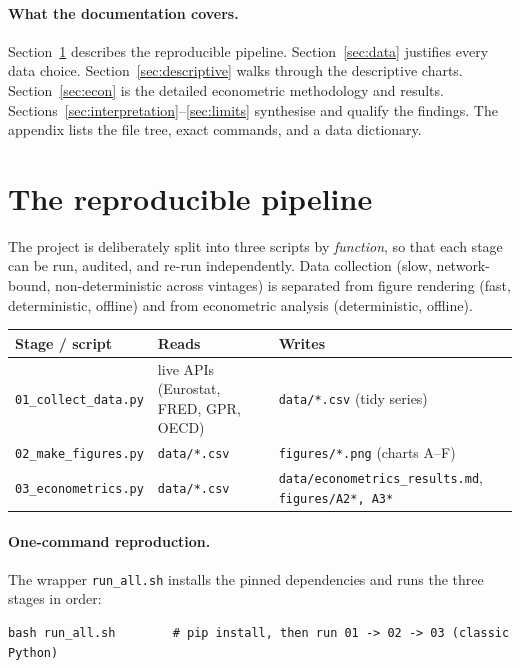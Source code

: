 \documentclass[11pt,a4paper]{article}
\newcommand{\code}[1]{\texttt{#1}}
\begin{document}
\paragraph{What the documentation covers.} Section~\ref{sec:pipeline} describes
the reproducible pipeline. Section~\ref{sec:data} justifies every data choice.
Section~\ref{sec:descriptive} walks through the descriptive charts.
Section~\ref{sec:econ} is the detailed econometric methodology and results.
Sections~\ref{sec:interpretation}--\ref{sec:limits} synthesise and qualify the
findings. The appendix lists the file tree, exact commands, and a data
dictionary.

\section{The reproducible pipeline}\label{sec:pipeline}

The project is deliberately split into three scripts by \emph{function}, so that
each stage can be run, audited, and re-run independently. Data collection (slow,
network-bound, non-deterministic across vintages) is separated from figure
rendering (fast, deterministic, offline) and from econometric analysis
(deterministic, offline).

\begin{center}
\renewcommand{\arraystretch}{1.25}
\begin{tabular}{@{}p{4.4cm} p{4.0cm} p{6.2cm}@{}}
\toprule
\textbf{Stage / script} & \textbf{Reads} & \textbf{Writes} \\
\midrule
\code{01\_collect\_data.py} & live APIs (Eurostat, FRED, GPR, OECD) &
  \code{data/*.csv} (tidy series) \\
\code{02\_make\_figures.py} & \code{data/*.csv} &
  \code{figures/*.png} (charts A--F) \\
\code{03\_econometrics.py} & \code{data/*.csv} &
  \code{data/econometrics\_results.md}, \code{figures/A2*, A3*} \\
\bottomrule
\end{tabular}
\end{center}

\paragraph{One-command reproduction.} The wrapper \code{run\_all.sh} installs the
pinned dependencies and runs the three stages in order:
\begin{lstlisting}
bash run_all.sh        # pip install, then run 01 -> 02 -> 03 (classic Python)
\end{lstlisting}
\end{document}
